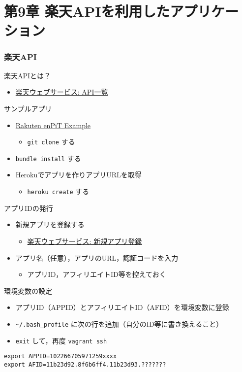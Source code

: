 \documentclass[t, aspectratio=169]{beamer}
\begin{document}
\part{第9章 楽天APIを利用したアプリケーション}
\label{sec-9}
\section{楽天API}
\label{sec-9-1}
\begin{frame}[label=sec-9-1-1]{楽天APIとは？}
\begin{itemize}
\item \href{http://webservice.rakuten.co.jp/document/}{楽天ウェブサービス: API一覧}
\end{itemize}
\end{frame}
\begin{frame}[fragile,label=sec-9-1-2]{サンプルアプリ}
 \begin{itemize}
\item \href{https://github.com/ryuichiueda/rakuten_enpit_example}{Rakuten enPiT Example}
\begin{itemize}
\item \texttt{git clone} する
\end{itemize}
\item \texttt{bundle install} する
\item Herokuでアプリを作りアプリURLを取得
\begin{itemize}
\item \texttt{heroku create} する
\end{itemize}
\end{itemize}
\end{frame}
\begin{frame}[label=sec-9-1-3]{アプリIDの発行}
\begin{itemize}
\item 新規アプリを登録する
\begin{itemize}
\item \href{https://webservice.rakuten.co.jp/app/create}{楽天ウェブサービス: 新規アプリ登録}
\end{itemize}
\item アプリ名（任意），アプリのURL，認証コードを入力
\begin{itemize}
\item アプリID，アフィリエイトID等を控えておく
\end{itemize}
\end{itemize}
\end{frame}
\begin{frame}[fragile,label=sec-9-1-4]{環境変数の設定}
 \begin{itemize}
\item アプリID（APPID）とアフィリエイトID（AFID）を環境変数に登録
\item \texttt{\textasciitilde{}/.bash\_profile} に次の行を追加（自分のID等に書き換えること）
\item \texttt{exit} して，再度 \texttt{vagrant ssh}
\end{itemize}

\begin{verbatim}
export APPID=102266705971259xxxx
export AFID=11b23d92.8f6b6ff4.11b23d93.???????
\end{verbatim}
\end{frame}
\end{document}
